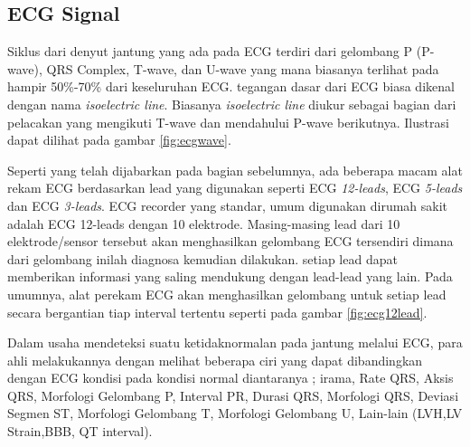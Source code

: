 
\subsection{ECG Signal} 
Siklus dari denyut jantung yang ada pada ECG terdiri dari gelombang P (P-wave),
QRS Complex, T-wave, dan U-wave yang mana biasanya terlihat pada hampir
50\%-70\% dari keseluruhan ECG. tegangan dasar dari ECG biasa dikenal dengan
nama \textit{isoelectric line}. Biasanya  \textit{isoelectric line} diukur
sebagai bagian dari pelacakan yang mengikuti T-wave dan mendahului P-wave
berikutnya. Ilustrasi dapat dilihat pada gambar \ref{fig:ecgwave}.



Seperti yang telah dijabarkan pada bagian sebelumnya, ada beberapa macam alat
rekam ECG berdasarkan lead yang digunakan seperti ECG \textit{12-leads}, ECG
\textit{5-leads} dan ECG \textit{3-leads}. ECG recorder yang standar, umum
digunakan dirumah sakit adalah ECG 12-leads dengan 10 elektrode. Masing-masing
lead  dari 10 elektrode/sensor tersebut akan menghasilkan gelombang ECG
tersendiri dimana dari gelombang inilah diagnosa kemudian dilakukan. setiap lead
dapat memberikan informasi yang saling mendukung dengan lead-lead yang lain.
Pada umumnya, alat perekam ECG akan menghasilkan gelombang untuk setiap lead
secara bergantian tiap interval tertentu seperti pada gambar
\ref{fig:ecg12lead}.




Dalam usaha mendeteksi suatu ketidaknormalan pada jantung melalui ECG,  para
ahli melakukannya  dengan melihat beberapa ciri yang dapat dibandingkan  dengan
ECG kondisi pada kondisi normal diantaranya ; irama, Rate QRS, Aksis QRS,
Morfologi Gelombang P, Interval PR, Durasi QRS, Morfologi QRS, Deviasi Segmen
ST, Morfologi Gelombang T, Morfologi Gelombang U, Lain-lain (LVH,LV Strain,BBB,
QT interval).

